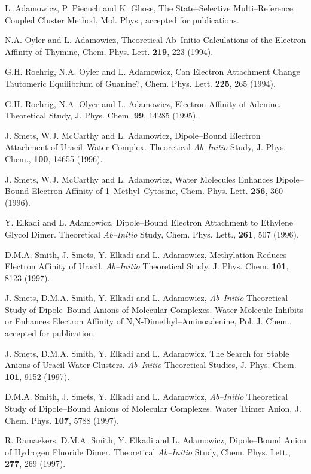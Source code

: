 \begin{thebibliography}{999}
L. Adamowicz, P. Piecuch and K. Ghose, 
The State--Selective Multi--Reference
Coupled Cluster Method, Mol. Phys., 
accepted for publications.



N.A. Oyler and L. Adamowicz, Theoretical Ab--Initio
Calculations of the Electron Affinity of 
Thymine, Chem. Phys. Lett. {\bf 219}, 223 (1994).


G.H. Roehrig, N.A. Oyler and L. Adamowicz, 
Can Electron Attachment Change Tautomeric
Equilibrium of Guanine?, Chem. Phys. Lett. {\bf 225}, 265 (1994).


G.H. Roehrig, N.A. Olyer
and L. Adamowicz, Electron Affinity of Adenine.  
Theoretical Study, J. Phys. Chem. {\bf 99},
14285 (1995). 


J. Smets, W.J. McCarthy and 
L. Adamowicz, Dipole--Bound Electron
Attachment of Uracil--Water Complex.  Theoretical 
{\it Ab--Initio} Study, 
J. Phys. Chem., {\bf 100}, 14655 (1996).

J. Smets, 
W.J. McCarthy and L. Adamowicz, Water Molecules
Enhances Dipole--Bound Electron Affinity of 1--Methyl--Cytosine, 
Chem. Phys. Lett. {\bf 256}, 360 (1996).

Y. Elkadi and L. Adamowicz, 
Dipole--Bound Electron Attachment
to Ethylene  Glycol Dimer.  Theoretical {\it Ab--Initio} 
Study, Chem. Phys. Lett., {\bf 261}, 507 (1996).

D.M.A. Smith, J. Smets, Y. Elkadi and 
L. Adamowicz, Methylation Reduces
Electron Affinity of Uracil.  {\it Ab--Initio} 
Theoretical Study, J. Phys. Chem.
{\bf 101}, 8123 (1997).

J. Smets, D.M.A. Smith, Y. Elkadi 
and L. Adamowicz, {\it Ab--Initio} Theoretical Study
of Dipole--Bound Anions of Molecular 
Complexes.  Water Molecule Inhibits or
Enhances Electron Affinity of N,N-Dimethyl--Aminoadenine, 
Pol. J. Chem., accepted
for publication.

J. Smets, D.M.A. Smith, Y. Elkadi and 
L. Adamowicz, The Search for Stable
Anions of Uracil Water Clusters.  {\it Ab--Initio} 
Theoretical Studies, J. Phys. Chem.
{\bf 101}, 9152 (1997).

D.M.A. Smith, J. Smets, Y. Elkadi and 
L. Adamowicz, {\it Ab--Initio} Theoretical Study
of Dipole--Bound Anions of Molecular 
Complexes.  Water Trimer Anion, J. Chem.
Phys.
{\bf 107}, 5788 (1997).

R. Ramaekers, D.M.A. Smith, Y. Elkadi and 
L. Adamowicz, Dipole--Bound Anion
of Hydrogen Fluoride Dimer.  Theoretical 
{\it Ab--Initio} Study, Chem. Phys. Lett.,
{\bf 277}, 269 (1997).


\end{thebibliography}
